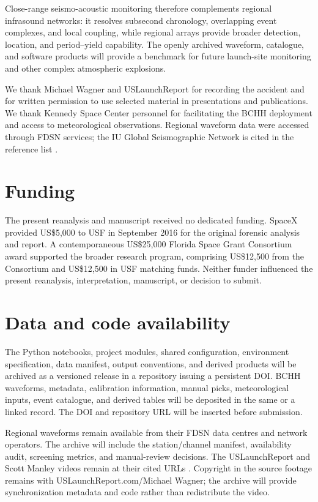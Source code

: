 \documentclass[]{seismica}
\begin{document}
Close-range seismo-acoustic monitoring therefore complements regional
infrasound networks: it resolves subsecond chronology, overlapping event
complexes, and local coupling, while regional arrays provide broader detection,
location, and period--yield capability. The openly archived waveform,
catalogue, and software products will provide a benchmark for future
launch-site monitoring and other complex atmospheric explosions.

\begin{acknowledgements}
We thank Michael Wagner and USLaunchReport for recording the accident and for
written permission to use selected material in presentations and publications.
We thank Kennedy Space Center personnel for facilitating the BCHH deployment
and access to meteorological observations. Regional waveform data were
accessed through FDSN services; the IU Global Seismographic Network is cited
in the reference list \citep{asl_gsn_iu_1988}.
\end{acknowledgements}

\section*{Funding}

The present reanalysis and manuscript received no dedicated funding. SpaceX
provided US\$5,000 to USF in September 2016 for the original forensic analysis
and report. A contemporaneous US\$25,000 Florida Space Grant Consortium award
supported the broader research program, comprising US\$12,500 from the
Consortium and US\$12,500 in USF matching funds. Neither funder influenced the
present reanalysis, interpretation, manuscript, or decision to submit.

\section*{Data and code availability}

The Python notebooks, project modules, shared configuration, environment
specification, data manifest, output conventions, and derived products will be
archived as a versioned release in a repository issuing a persistent DOI. BCHH
waveforms, metadata, calibration information, manual picks, meteorological
inputs, event catalogue, and derived tables will be deposited in the same or a
linked record. The DOI and repository URL will be inserted before submission.

Regional waveforms remain available from their FDSN data centres and network
operators. The archive will include the station/channel manifest, availability
audit, screening metrics, and manual-review decisions. The USLaunchReport and
Scott Manley videos remain at their cited URLs
\citep{uslaunchreport_amos6_video_2016,manley_spacex_explosion_2016}. Copyright
in the source footage remains with USLaunchReport.com/Michael Wagner; the
archive will provide synchronization metadata and code rather than redistribute
the video.
\end{document}
